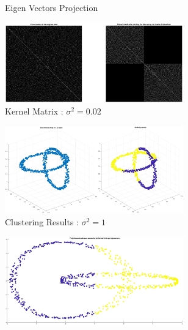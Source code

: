 \begin{figure}[ht]
\begin{subfigure}[b]{0.32\textwidth}
		\caption{Eigen Vectors Projection }\label{fig:sclust_sig_0.02_1}
	\end{subfigure}%
	\begin{subfigure}[b]{0.32\textwidth}
		\centering
		\includegraphics[height= 0.55\textwidth, width = 0.85\textwidth]{Exercise3/Report/sclust_sig_0.02_2}
		\caption{Kernel Matrix : $\sigma^2 = 0.02$}\label{fig:sclust_sig_0.02_2}
	\end{subfigure}
		\begin{subfigure}[b]{0.32\textwidth}
		\centering
		\includegraphics[height= 0.55\textwidth, width = 0.85\textwidth]{Exercise3/Report/sclust_sig_1.eps}
		\caption{Clustering Results : $\sigma^2 = 1$ }\label{fig:sclust_sig_1}
	\end{subfigure}%
	\begin{subfigure}[b]{0.32\textwidth}
		\centering
		\includegraphics[height= 0.55\textwidth, width = 0.85\textwidth]{Exercise3/Report/sclust_sig_1_1}

\end{subfigure}
\end{figure}
